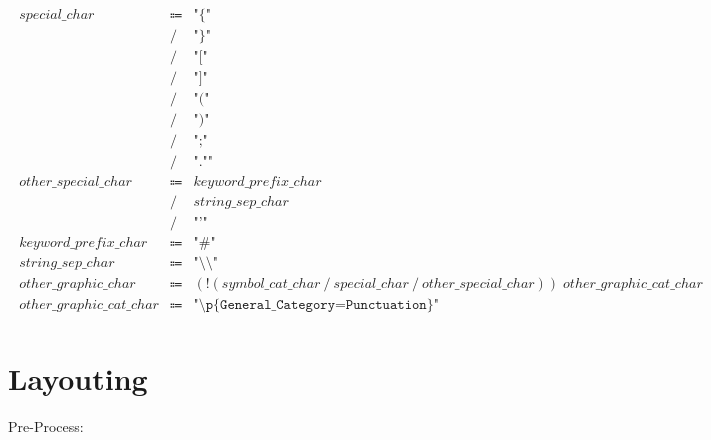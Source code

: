 \begin{align*}
    \begin{array}{rcll}
        \mathit{special\_char}
        &\Coloneq &\texttt{"\{"} \\
        &\mathrel{/} &\texttt{"\}"} \\
        &\mathrel{/} &\texttt{"["} \\
        &\mathrel{/} &\texttt{"]"} \\
        &\mathrel{/} &\texttt{"("} \\
        &\mathrel{/} &\texttt{")"} \\
        &\mathrel{/} &\texttt{";"} \\
        &\mathrel{/} &\texttt{".""} \\
        \mathit{other\_special\_char}
        &\Coloneq &\mathit{keyword\_prefix\_char} \\
        &\mathrel{/} &\mathit{string\_sep\_char} \\
        &\mathrel{/} &\texttt{"'"} \\
        \mathit{keyword\_prefix\_char}
        &\Coloneq &\texttt{"\#"} \\
        \mathit{string\_sep\_char}
        &\Coloneq &\texttt{"\textbackslash \textbackslash "} \\
        \mathit{other\_graphic\_char}
        &\Coloneq &(\mathop{!} (\mathit{symbol\_cat\_char} \mathrel{/} \mathit{special\_char} \mathrel{/} \mathit{other\_special\_char}))\; \mathit{other\_graphic\_cat\_char} \\
        \mathit{other\_graphic\_cat\_char}
        &\Coloneq &\texttt{"\textbackslash p\{General\_Category=Punctuation\}"}
    \end{array}
\end{align*}

\section{Layouting}

Pre-Process:

